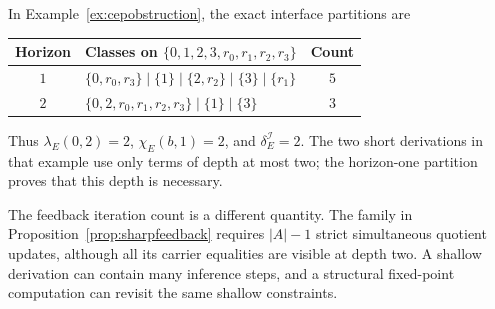 In Example~\ref{ex:cepobstruction}, the exact interface partitions are
\begin{center}
\begin{tabular}{@{}clc@{}}
\toprule
Horizon & Classes on $\{0,1,2,3,r_0,r_1,r_2,r_3\}$ & Count\\
\midrule
$1$ & $\{0,r_0,r_3\}\mid\{1\}\mid\{2,r_2\}\mid\{3\}\mid\{r_1\}$ & $5$\\
$2$ & $\{0,2,r_0,r_1,r_2,r_3\}\mid\{1\}\mid\{3\}$ & $3$\\
\bottomrule
\end{tabular}
\end{center}
Thus $\lambda_E(0,2)=2$, $\chi_E(b,1)=2$, and
$\delta_E^{\mathcal I}=2$. The two short derivations in that example use
only terms of depth at most two; the horizon-one partition proves that this
depth is necessary.

The feedback iteration count is a different quantity. The family in
Proposition~\ref{prop:sharpfeedback} requires $|A|-1$ strict simultaneous
quotient updates, although all its carrier equalities are visible at depth
two. A shallow derivation can contain many inference steps, and a structural
fixed-point computation can revisit the same shallow constraints.

